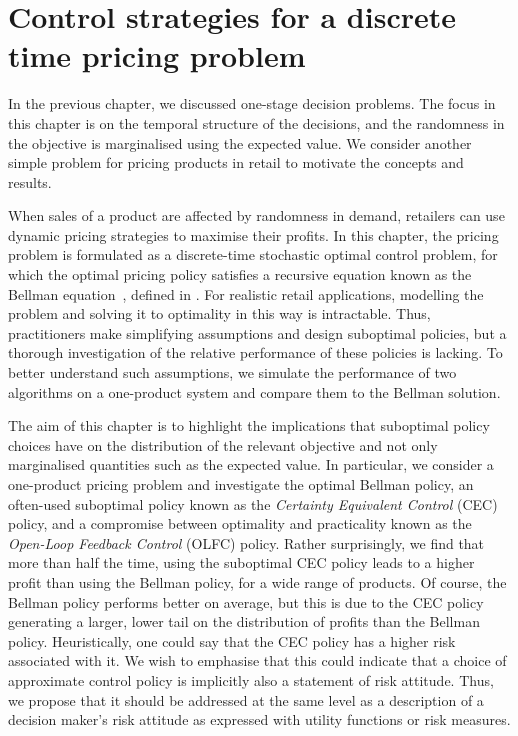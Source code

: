 \documentclass[main.tex]{subfiles}
\begin{document}
\chapter{Control strategies for a discrete time pricing
  problem}\label{ch:discrete_control}

In the previous chapter, we discussed one-stage decision problems.
The focus in this chapter is on the temporal structure of the
decisions, and the randomness in the objective is marginalised using
the expected value.
We consider another simple problem for pricing
products in retail to motivate the concepts and results.

When sales of a product are affected by randomness in demand,
retailers can use dynamic pricing strategies to maximise their
profits. In this chapter, the pricing problem is formulated as a
discrete-time stochastic optimal control problem, for which the
optimal pricing policy satisfies a recursive equation known as the
Bellman equation~\citep{bertsekas2005dynamic}, defined in
.
For realistic retail applications, modelling the problem
and solving it to optimality in this way is intractable. Thus,
practitioners make
simplifying assumptions and design suboptimal policies, but a thorough
investigation of the relative performance of these policies is
lacking. To better understand such assumptions, we simulate the
performance of two algorithms on a one-product system and compare them
to the Bellman solution.

The aim of this chapter is to highlight the implications that
suboptimal policy
choices have on the distribution of the relevant objective and not
only marginalised quantities such as the expected value.
In particular, we consider a one-product pricing problem and
investigate the optimal Bellman policy, an often-used suboptimal
policy known as the \emph{Certainty Equivalent Control} (CEC)
policy, and a compromise between optimality and practicality known as the
\emph{Open-Loop Feedback Control} (OLFC) policy.
Rather surprisingly, we find that more than half the
time, using the suboptimal CEC policy
leads to a higher profit than using the Bellman policy, for a wide
range of products. Of course, the
Bellman policy performs better on average, but
this is due to the CEC policy generating a larger, lower tail on the
distribution of profits than the Bellman policy.
Heuristically, one could say that the CEC policy has a higher risk
associated with it. We wish to emphasise that this could indicate that a
choice of approximate control policy is implicitly also a statement of
risk attitude. Thus, we propose that it should be addressed at the same level as a
description of a decision maker's risk attitude as expressed with
utility functions or risk measures.
\end{document}
